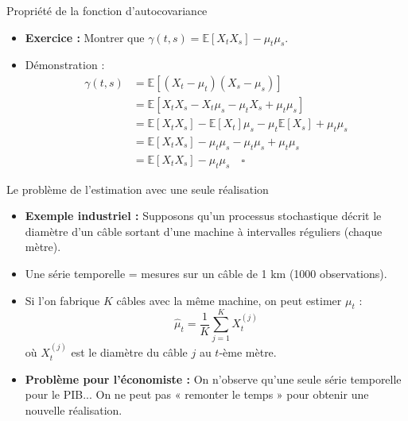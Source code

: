 \documentclass[11pt,aspectratio=169]{beamer}
\newcommand{\E}{\mathbb{E}}
\begin{document}
\begin{frame}{Propriété de la fonction d'autocovariance}

\begin{itemize}

\item \textbf{Exercice :} Montrer que $\gamma(t,s) = \E[X_t X_s] - \mu_t \mu_s$.\newline

\item Démonstration :
  \begin{align*}
  \gamma(t,s) &= \E\left[(X_t - \mu_t)(X_s - \mu_s)\right] \\
  &= \E\left[X_t X_s - X_t \mu_s - \mu_t X_s + \mu_t \mu_s\right] \\
  &= \E[X_t X_s] - \E[X_t]\mu_s - \mu_t \E[X_s] + \mu_t \mu_s \\
  &= \E[X_t X_s] - \mu_t \mu_s - \mu_t \mu_s + \mu_t \mu_s \\
  &= \E[X_t X_s] - \mu_t \mu_s \quad \square
  \end{align*}

\end{itemize}

\end{frame}

\begin{frame}{Le problème de l'estimation avec une seule réalisation}

\begin{itemize}

\item \textbf{Exemple industriel :} Supposons qu'un processus stochastique décrit le diamètre d'un câble sortant d'une machine à intervalles réguliers (chaque mètre).\newline

\item Une série temporelle = mesures sur un câble de 1 km (1000 observations).\newline

\item Si l'on fabrique $K$ câbles avec la même machine, on peut estimer $\mu_t$ :
  \[
  \hat{\mu}_t = \frac{1}{K} \sum_{j=1}^{K} X_t^{(j)}
  \]
  où $X_t^{(j)}$ est le diamètre du câble $j$ au $t$-ème mètre.\newline

\item \textbf{Problème pour l'économiste :} On n'observe qu'une seule série temporelle pour le PIB... On ne peut pas « remonter le temps » pour obtenir une nouvelle réalisation.

\end{itemize}

\end{frame}
\end{document}
